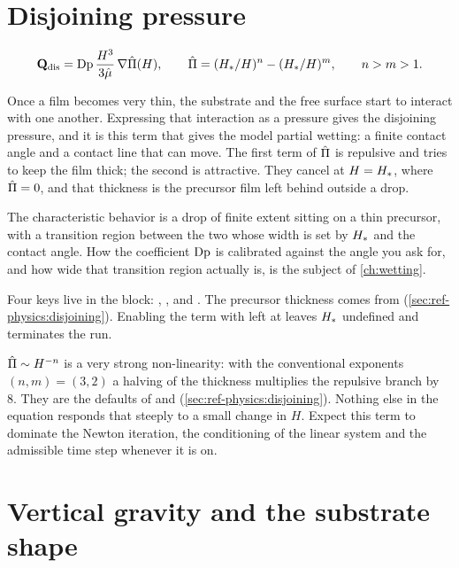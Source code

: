 \section{Disjoining pressure}
\label{sec:terms:disjoining}

\begin{equation}\label{eq:q-dis}
  \mathbf{Q}_{\mathrm{dis}} = \mathrm{Dp}\,\frac{H^{3}}{3\hat{\mu}}\,\nabla\hat{\Pi}(H),
  \qquad
  \hat{\Pi} = (H_{*}/H)^{n} - (H_{*}/H)^{m},
  \qquad n > m > 1.
\end{equation}

Once a film becomes very thin, the substrate and the free surface start to
interact with one another. Expressing that interaction as a pressure gives the
disjoining pressure, and it is this term that gives the model partial wetting:
a finite contact angle and a contact line that can move. The first term of
$\hat{\Pi}$ is repulsive and tries to keep the film thick; the second is
attractive. They cancel at $H = H_{*}$, where $\hat{\Pi} = 0$, and that thickness
is the precursor film left behind outside a drop.

The characteristic behavior is a drop of finite extent sitting on a thin
precursor, with a transition region between the two whose width is set by
$H_{*}$ and the contact angle. How the coefficient $\mathrm{Dp}$ is calibrated
against the angle you ask for, and how wide that transition region actually is,
is the subject of \cref{ch:wetting}.

Four keys live in the  block: ,
,  and . The precursor
thickness comes from 
(\cref{sec:ref-physics:disjoining}). Enabling the term with
 left at  leaves $H_{*}$ undefined and terminates
the run.

\begin{warn}
  $\hat{\Pi} \sim H^{-n}$ is a very strong non-linearity: with the conventional
  exponents $(n,m) = (3,2)$ a halving of the thickness multiplies the repulsive
  branch by 8. They are the defaults of  and 
  (\cref{sec:ref-physics:disjoining}).
  Nothing else in the equation responds that steeply to a small change in $H$.
  Expect this term to dominate the Newton iteration, the conditioning of the
  linear system and the admissible time step whenever it is on.
\end{warn}

\section{Vertical gravity and the substrate shape}
\label{sec:terms:vgravity}

